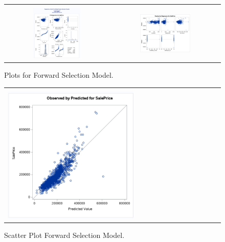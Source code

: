 \documentclass[11pt]{scrartcl} %
\begin{document}
\begin{figure}[H] %
	\centering
	\begin{tabular}{p{} p{}}
	\hline
	\multicolumn{1}{|c}{} &  \multicolumn{1}{c|}{} \\
		\multicolumn{1}{|c}{\includegraphics[width=0.48\textwidth]{../graphics/A2FWAss1}} &
		\multicolumn{1}{c|}{\includegraphics[width=0.48\textwidth]{../graphics/A2FWAss2}}\\
		\hline
	\end{tabular}		
	\caption{Plots for Forward Selection Model.} %
	\label{fig:A2FWAss}
\end{figure}
\begin{figure}[H] %
	\centering
	\begin{tabular}{| p{}|}
	\hline
	\\
	\includegraphics[width=0.60\textwidth]{../graphics/A2FWscatt}\\
	\hline
	\end{tabular}	
	\caption{Scatter Plot Forward Selection Model.} %
	\label{fig:A2FWscatt}
\end{figure}
\end{document}
